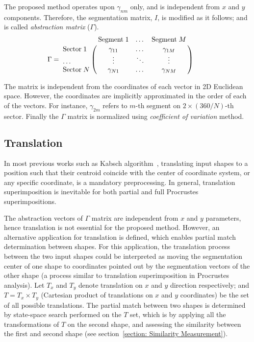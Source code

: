 The proposed method operates upon $\gamma_{nm}$ only, and is independent from $x$ and $y$ components. Therefore, the segmentation matrix, $I$, is modified as it follows; and is called \textit{abstraction matrix} ($\Gamma$).
\[
\Gamma =
\bordermatrix{           & \text{Segment} \; 1  & \dots  & \text{Segment} \; M \cr
	  \text{Sector} \; 1 & \gamma_{11}          & \dots  & \gamma_{1M}         \cr
	  \dots              & \vdots               & \ddots & \vdots              \cr
	  \text{Sector} \; N & \gamma_{N1}          & \dots  & \gamma_{NM}}        \qquad
\]

The matrix is independent from the coordinates of each vector in 2D Euclidean space. However, the coordinates are implicitly approximated in the order of each of the vectors. For instance, $\gamma_{2m}$ refers to $m$-th segment on $2 \times (360/N)$-th sector. Finally the $\Gamma$ matrix is normalized using \textit{coefficient of variation} method. 




\subsection{Translation} \label{section: Translation}
In most previous works such as Kabsch algorithm~\cite{kabsch1976solution}, translating input shapes to a position such that their centroid coincide with the center of coordinate system, or any specific coordinate, is a mandatory preprocessing. In general, translation superimposition is inevitable for both partial and full Procrustes superimpositions. 

The abstraction vectors of $\Gamma$ matrix are independent from $x$ and $y$ parameters, hence translation is not essential for the proposed method. However, an alternative application for translation is defined, which enables partial match determination between shapes. For this application, the translation process between the two input shapes could be interpreted as moving the segmentation center of one shape to coordinates pointed out by the segmentation vectors of the other shape (a process similar to translation superimposition in Procrustes analysis). 
Let $T_x$ and $T_y$ denote translation on $x$ and $y$ direction respectively; and $T=T_x \times T_y$ (Cartesian product of translations on $x$ and $y$ coordinates) be the set of all possible translations. The partial match between two shapes is determined by state-space search performed on the $T$ set, which is by applying all the transformations of $T$ on the second shape, and assessing the similarity between the first and second shape (see section~\ref{section: Similarity Measurement}).



